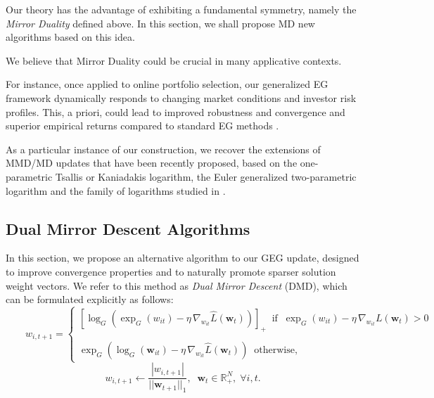 \documentclass[10pt]{amsart}
\newcommand{\beq}{\begin{equation}}
\newcommand{\eeq}{\end{equation}}
\newcommand{\bw}{\boldsymbol{w}}
\theoremstyle{definition}
\theoremstyle{definition}	 %
\begin{document}
Our theory has the advantage of exhibiting a fundamental symmetry, namely the \textit{Mirror Duality} defined above.
In this section, we shall propose MD new algorithms based on this idea.

\vspace{4mm}





We believe that Mirror Duality could be crucial in many applicative contexts.

For instance, once applied to online portfolio selection, our generalized EG framework dynamically responds to changing market conditions and investor risk profiles. This, a priori, could lead to improved robustness and convergence and superior empirical returns compared to standard EG methods \cite{Helmbold98,Momentum}.

As a particular instance of our construction, we recover the extensions of MMD/MD updates that have been recently proposed, based on the one-parametric Tsallis or Kaniadakis  logarithm, the Euler generalized two-parametric logarithm \cite{Cichocki2025a} and the family of logarithms studied in \cite{Cichocki2025b,Cichocki2024}.

\subsection{Dual Mirror Descent Algorithms}


In this section, we propose an alternative algorithm to our  GEG update, designed to improve convergence properties and to naturally promote
 sparser solution weight vectors. We refer to this method as \textit{Dual Mirror Descent} (DMD), which can be formulated explicitly as follows:
\beq \label{eq:43}
\qquad  {w}_{i,t+1} = \left\{
\displaystyle	\begin{array}{l} \left[ \log_G \left( \exp_G (w_{it}) - \eta \, \nabla_{w_{it}} \widehat{L}(\bw_t) \right) \right]_+  \;\; \text{if}\;\;
\exp_G (w_{it}) - \eta \, \nabla_{w_{it}} L(\bw_t)>0 \\
\\
\exp_G \left( \log_G (\bw_{it}) - \eta \, \nabla_{w_{it}} \widehat{L}(\bw_t) \right) \;\; \text{otherwise},
	\end{array}	
	\right.
\eeq
\beq
 w_{i,t+1} \leftarrow  \frac{|{w}_{i,t+1}|}{||{\bw}_{t+1}||_1}, \;\; \bw_t \in \mathbb{R}^{N}_{+}, \; \forall i,t.
 \eeq
%
\end{document}
